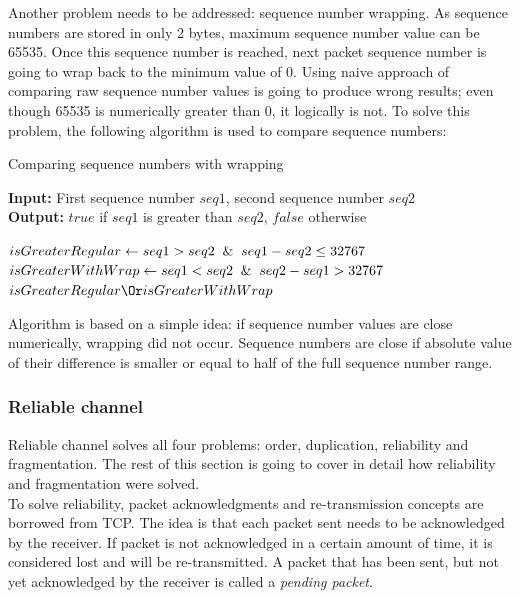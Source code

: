 \documentclass[times, utf8, diplomski]{fer}
\begin{document}
Another problem needs to be addressed: sequence number wrapping. As sequence numbers are stored in only 2 bytes, maximum sequence number value can be 65535. Once this sequence number is reached, next packet sequence number is going to wrap back to the minimum value of 0. Using naive approach of comparing raw sequence number values is going to produce wrong results; even though 65535 is numerically greater than 0, it logically is not. To solve this problem, the following algorithm is used to compare sequence numbers:

\begin{algorithm}[H]
	\caption{Comparing sequence numbers with wrapping}
	\textbf{Input:} First sequence number $seq1$, second sequence number $seq2$ \\
	\textbf{Output:} $true$ if $seq1$ is greater than $seq2$, $false$ otherwise \\
	
	\begin{algorithmic}
		\State $isGreaterRegular \gets seq1 > seq2 \And seq1 - seq2 \leq 32767$
		\State $isGreaterWithWrap \gets seq1 < seq2 \And seq2 - seq1 > 32767$ \\
		\Return $isGreaterRegular \Or isGreaterWithWrap$
	\end{algorithmic}
\end{algorithm}

Algorithm is based on a simple idea: if sequence number values are close numerically, wrapping did not occur. Sequence numbers are close if absolute value of their difference is smaller or equal to half of the full sequence number range.


\subsubsection{Reliable channel}
Reliable channel solves all four problems: order, duplication, reliability and fragmentation. The rest of this section is going to cover in detail how reliability and fragmentation were solved.\\

To solve reliability, packet acknowledgments and re-transmission concepts are borrowed from TCP. The idea is that each packet sent needs to be acknowledged by the receiver. If packet is not acknowledged in a certain amount of time, it is considered lost and will be re-transmitted. A packet that has been sent, but not yet acknowledged by the receiver is called a \textit{pending packet}. \\
\end{document}
